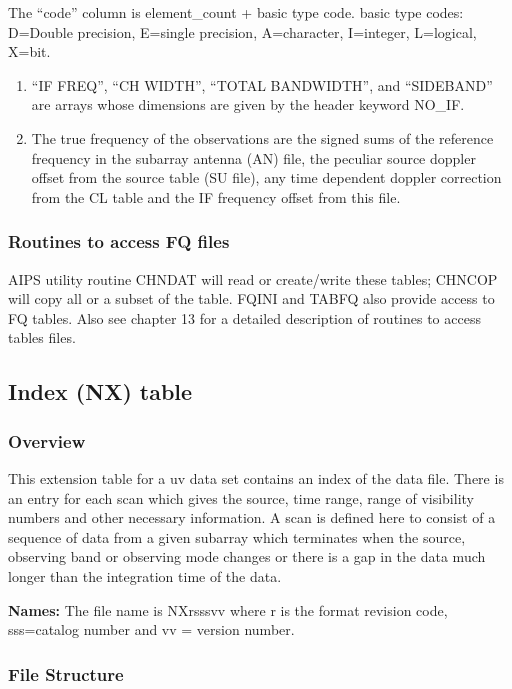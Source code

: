   The ``code'' column is element\_count + basic type code.
basic type codes: D=Double precision, E=single precision, A=character,
I=integer, L=logical, X=bit.

\begin{enumerate}
\item ``IF FREQ'', ``CH WIDTH'', ``TOTAL BANDWIDTH'', and ``SIDEBAND''
are arrays whose dimensions are given by the header keyword NO\_IF.
\item The true frequency of the observations are the signed sums of the
reference frequency in the subarray antenna (AN) file, the peculiar
source doppler offset from the source table (SU file), any time
dependent doppler correction from the CL table and the IF frequency
offset from this file.
\end{enumerate}
\subsubsection{Routines to access FQ files}
     AIPS utility routine CHNDAT will read or
create/write these tables; CHNCOP will copy all or a
subset of the table.  FQINI and TABFQ also
provide access to FQ tables.  Also see chapter 13 for a detailed
description of routines to access tables files.

\subsection{Index (NX) table }
\subsubsection{Overview}

   This extension table for a uv data set contains an index of the data
file.  There is an entry for each scan which gives the source, time
range, range of visibility numbers and other necessary information.
A scan is defined here to consist of a sequence of data from a given
subarray which terminates when the source, observing band or observing
mode changes or there is a gap in the data much longer than the
integration time of the data.

{\bf Names:} The file name is NXrsssvv where r is the format revision
code, sss=catalog number and vv = version number.

\subsubsection{File Structure}

